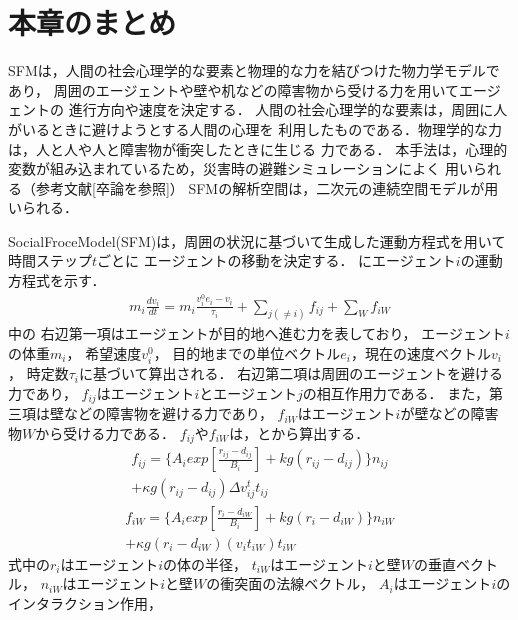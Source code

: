 \section{本章のまとめ}

SFMは，人間の社会心理学的な要素と物理的な力を結びつけた物力学モデルであり，
周囲のエージェントや壁や机などの障害物から受ける力を用いてエージェントの
進行方向や速度を決定する．
人間の社会心理学的な要素は，周囲に人がいるときに避けようとする人間の心理を
利用したものである．物理学的な力は，人と人や人と障害物が衝突したときに生じる
力である．
本手法は，心理的変数が組み込まれているため，災害時の避難シミュレーションによく
用いられる（参考文献[卒論を参照]）
SFMの解析空間は，二次元の連続空間モデルが用いられる．



SocialFroceModel(SFM)は，周囲の状況に基づいて生成した運動方程式を用いて時間ステップ$t$ごとに
エージェントの移動を決定する．
にエージェント$i$の運動方程式を示す．
%
\begin{eqnarray}
  m_i \frac{dv_i}{dt} = m_i \frac{v_i^0 e_i - v_i}{\tau_i}
  +\sum_{j(\neq i)}f_{ij}+\sum_{W}f_{iW}
  \label{eq:sfm_siki1}
\end{eqnarray}
%
中の
右辺第一項はエージェントが目的地へ進む力を表しており，
エージェント$i$の体重$m_i$，
希望速度$v_i^0$，
目的地までの単位ベクトル$e_i$，現在の速度ベクトル$v_i$，
時定数$\tau_i$に基づいて算出される．
右辺第二項は周囲のエージェントを避ける力であり，
$f_{ij}$はエージェント$i$とエージェント$j$の相互作用力である．
また，第三項は壁などの障害物を避ける力であり，
$f_{iW}$はエージェント$i$が壁などの障害物$W$から受ける力である．
$f_{ij}$や$f_{iW}$は，とから算出する．
%
\begin{eqnarray}
  f_{ij} =  \{A_i exp [\frac{r_{ij} - d_{ij}}{B_i}  ]
  + kg(r_{ij} - d_{ij})\} n_{ij} \\ \nonumber
  + \kappa g (r_{ij} - d_{ij}) \Delta
  v^t_{ij} t_{ij}
  \label{eq:sfm_siki2}
\end{eqnarray}
%
\begin{eqnarray}
  f_{iW} = \{A_i exp[\frac{r_{i} - d_{iW}}{B_i}]
  + kg(r_{i} - d_{iW})\} n_{iW} \\ \nonumber
  + \kappa g (r_{i} - d_{iW}) (v_i t_{iW}) t_{iW}
  \label{eq:sfm_siki3}
\end{eqnarray}
%
式中の$r_i$はエージェント$i$の体の半径，
$t_{iW}$はエージェント$i$と壁$W$の垂直ベクトル，
$n_{iW}$はエージェント$i$と壁$W$の衝突面の法線ベクトル，
$A_i$はエージェント$i$のインタラクション作用，
